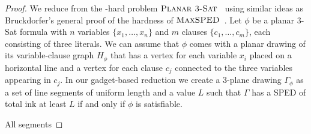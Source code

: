 \documentclass[a4paper,english,numberwithinsect]{eurocg18}
\newcommand{\maxsped}{\ensuremath{\textsc{MaxSPED}}\xspace}
\newcommand{\ppsat}{\ensuremath{\textsc{Planar 3-Sat}}\xspace}
\begin{document}
\begin{proof}
	We reduce from the \NP-hard problem \ppsat~\cite{l-pftu-82} using similar ideas as Bruckdorfer's general proof of the hardness of \maxsped~\cite{b-sgh-15}. 
	Let $\phi$ be a planar 3-Sat formula with $n$ variables $\{x_1, \dots, x_n\}$ and $m$ clauses $\{c_1, \dots, c_m\}$, each consisting of three literals.
	We can assume that $\phi$ comes with a planar drawing of its variable-clause graph $H_\phi$ that has a vertex for each variable $x_i$ placed on a horizontal line and a vertex for each clause $c_j$ connected to the three variables appearing in $c_j$. 
	In our gadget-based reduction we create a 3-plane drawing $\Gamma_\phi$ as a set of line segments of uniform length and a value $L$ such that $\Gamma$ has a SPED of total ink at least $L$ if and only if $\phi$ is satisfiable.
	
	All segments 
	




\end{proof}
\end{document}
